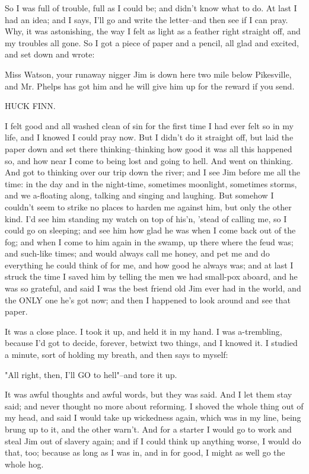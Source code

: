 So I was full of trouble, full as I could be; and didn't know what to do.
At last I had an idea; and I says, I'll go and write the letter--and then
see if I can pray.  Why, it was astonishing, the way I felt as light as a
feather right straight off, and my troubles all gone.  So I got a piece
of paper and a pencil, all glad and excited, and set down and wrote:

Miss Watson, your runaway nigger Jim is down here two mile below
Pikesville, and Mr. Phelps has got him and he will give him up for the
reward if you send.

HUCK FINN.

I felt good and all washed clean of sin for the first time I had ever
felt so in my life, and I knowed I could pray now.  But I didn't do it
straight off, but laid the paper down and set there thinking--thinking
how good it was all this happened so, and how near I come to being lost
and going to hell.  And went on thinking.  And got to thinking over our
trip down the river; and I see Jim before me all the time:  in the day
and in the night-time, sometimes moonlight, sometimes storms, and we
a-floating along, talking and singing and laughing.  But somehow I
couldn't seem to strike no places to harden me against him, but only the
other kind.  I'd see him standing my watch on top of his'n, 'stead of
calling me, so I could go on sleeping; and see him how glad he was when I
come back out of the fog; and when I come to him again in the swamp, up
there where the feud was; and such-like times; and would always call me
honey, and pet me and do everything he could think of for me, and how
good he always was; and at last I struck the time I saved him by telling
the men we had small-pox aboard, and he was so grateful, and said I was
the best friend old Jim ever had in the world, and the ONLY one he's got
now; and then I happened to look around and see that paper.

It was a close place.  I took it up, and held it in my hand.  I was
a-trembling, because I'd got to decide, forever, betwixt two things, and
I knowed it.  I studied a minute, sort of holding my breath, and then
says to myself:

"All right, then, I'll GO to hell"--and tore it up.

It was awful thoughts and awful words, but they was said.  And I let them
stay said; and never thought no more about reforming.  I shoved the whole
thing out of my head, and said I would take up wickedness again, which
was in my line, being brung up to it, and the other warn't.  And for a
starter I would go to work and steal Jim out of slavery again; and if I
could think up anything worse, I would do that, too; because as long as I
was in, and in for good, I might as well go the whole hog.

